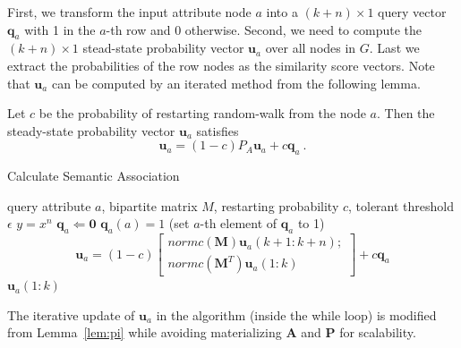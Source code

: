 First, we transform the input attribute node $a$ into a $(k+n) \times 1$ query vector $\mathbf{q}_a$ with 1 in the $a$-th row and 0 otherwise. Second, we need to compute the $(k+n)\times 1$ stead-state probability vector $\mathbf{u}_a$ over all nodes in $G$. Last we extract the probabilities of the row nodes as the similarity score vectors. Note that $\mathbf{u}_a$ can be computed by an iterated method from the following lemma.

\begin{mylem}\label{lem:pi}
Let $c$ be the probability of restarting random-walk from the node $a$. Then the steady-state probability vector $\mathbf{u}_a$ satisfies
\begin{equation}
\mathbf{u}_a=(1-c)P_A\mathbf{u}_a+c\mathbf{q}_a~.
\end{equation}
\end{mylem}

\renewcommand{\algorithmicrequire}{\textbf{Input:}}
\renewcommand{\algorithmicensure}{\textbf{Output:}}
\begin{algorithm}
\caption{Calculate Semantic Association}
\label{alg1}
\begin{algorithmic}
\REQUIRE query attribute $a$, bipartite matrix $M$, restarting probability $c$, tolerant threshold $\epsilon$
\ENSURE $y = x^n$
\STATE $\mathbf{q}_a \Leftarrow \mathbf{0}$
\STATE $\mathbf{q}_a(a)=1$ (set $a$-th element of $\mathbf{q}_a$ to 1)
\STATE \[
    \mathbf{u}_a = (1-c)  \left[ \begin{array}{c}
        normc(\mathbf{M})\mathbf{u}_a(k+1:k+n);\\
        normc(\mathbf{M}^T)\mathbf{u}_a(1:k)
    \end{array} \right] + c\mathbf{q}_a
\]
\ENDWHILE
\RETURN $\mathbf{u}_a(1:k)$
\end{algorithmic}
\end{algorithm}

The iterative update of $\mathbf{u}_a$ in the algorithm (inside the while loop) is modified from Lemma~\ref{lem:pi} while avoiding materializing $\mathbf{A}$ and $\mathbf{P}$ for scalability.

